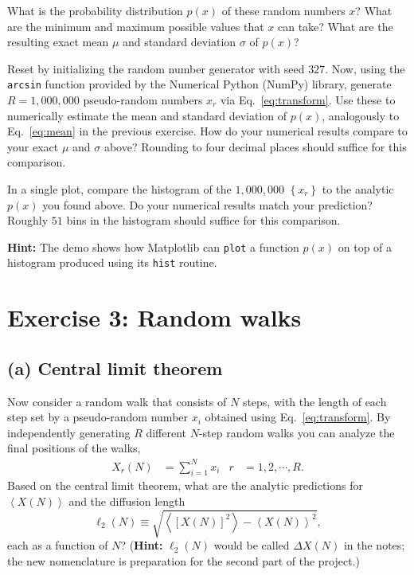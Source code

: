 \documentclass[12 pt]{article} %
\newcommand{\si}{\ensuremath{\sigma} }
\newcommand{\vev}[1]{\ensuremath{\left\langle #1 \right\rangle} }
\newcommand{\eq}[1]{Eq.~\ref{#1}}
\newcommand{\showmarks}[1]{\rightline{\texttt{[#1 marks]}}} %
\begin{document}
What is the probability distribution $p(x)$ of these random numbers $x$?
What are the minimum and maximum possible values that $x$ can take?
What are the resulting exact mean $\mu$ and standard deviation \si of $p(x)$?

\showmarks{5}

Reset by initializing the random number generator with seed $327$.
Now, using the \texttt{arcsin} function provided by the Numerical Python (NumPy) library, generate $R = 1{,}000{,}000$ pseudo-random numbers $x_r$ via \eq{eq:transform}.
Use these to numerically estimate the mean and standard deviation of $p(x)$, analogously to \eq{eq:mean} in the previous exercise.
How do your numerical results compare to your exact $\mu$ and \si above?
Rounding to four decimal places should suffice for this comparison.

\showmarks{5}

In a single plot, compare the histogram of the $1{,}000{,}000$ $\left\{x_r\right\}$ to the analytic $p(x)$ you found above.
Do your numerical results match your prediction?
Roughly $51$ bins in the histogram should suffice for this comparison.

\textbf{Hint:} The demo shows how Matplotlib can \texttt{plot} a function $p(x)$ on top of a histogram produced using its \texttt{hist} routine.

\showmarks{5}



\newpage %
\section*{Exercise 3: Random walks}
\subsection*{(a) Central limit theorem}
Now consider a random walk that consists of $N$ steps, with the length of each step set by a pseudo-random number $x_i$ obtained using \eq{eq:transform}.
By independently generating $R$ different $N$-step random walks you can analyze the final positions of the walks,
\begin{align*}
  X_r(N) & = \sum_{i = 1}^N x_i &
  r & = 1, 2, \cdots, R.
\end{align*}
Based on the central limit theorem, what are the analytic predictions for $\vev{X(N)}$ and the diffusion length
\begin{equation*}
  \ell_2(N) \equiv \sqrt{\vev{\left[X(N)\right]^2} - \vev{X(N)}^2},
\end{equation*}
each as a function of $N$?
(\textbf{Hint:} $\ell_2(N)$ would be called $\Delta X(N)$ in the notes; the new nomenclature is preparation for the second part of the project.)
\end{document}
